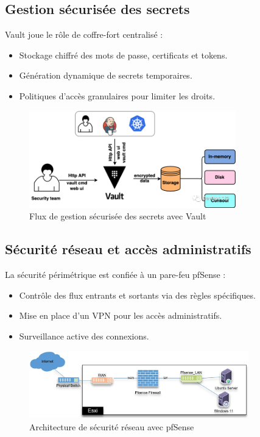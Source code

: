 \subsection{Gestion sécurisée des secrets}

Vault joue le rôle de coffre-fort centralisé :
\begin{itemize}
	\item Stockage chiffré des mots de passe, certificats et tokens.
	\item Génération dynamique de secrets temporaires.
	\item Politiques d’accès granulaires pour limiter les droits.
\end{itemize}

\begin{figure}[H]
	\centering
	\includegraphics[width=0.8\textwidth]{figures/vault-gestion-secrets.png}
	\caption{Flux de gestion sécurisée des secrets avec Vault}
\end{figure}

\subsection{Sécurité réseau et accès administratifs}

La sécurité périmétrique est confiée à un pare-feu pfSense :
\begin{itemize}
	\item Contrôle des flux entrants et sortants via des règles spécifiques.
	\item Mise en place d’un VPN pour les accès administratifs.
	\item Surveillance active des connexions.
\end{itemize}

\begin{figure}[H]
	\centering
	\includegraphics[width=0.85\textwidth]{figures/pfsense-securite.png}
	\caption{Architecture de sécurité réseau avec pfSense}
\end{figure}

